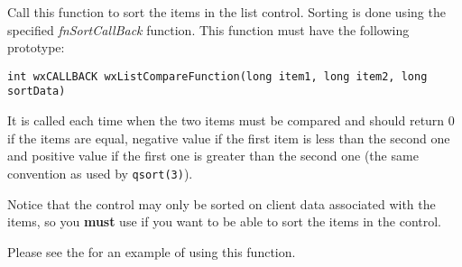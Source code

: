 
Call this function to sort the items in the list control. Sorting is done
using the specified {\it fnSortCallBack} function. This function must have the
following prototype:

\begin{verbatim}
int wxCALLBACK wxListCompareFunction(long item1, long item2, long sortData)
\end{verbatim}

It is called each time when the two items must be compared and should return 0
if the items are equal, negative value if the first item is less than the
second one and positive value if the first one is greater than the second one
(the same convention as used by {\tt qsort(3)}).





Notice that the control may only be sorted on client data associated with the
items, so you {\bf must} use  if
you want to be able to sort the items in the control.

Please see the  for an example of
using this function.



